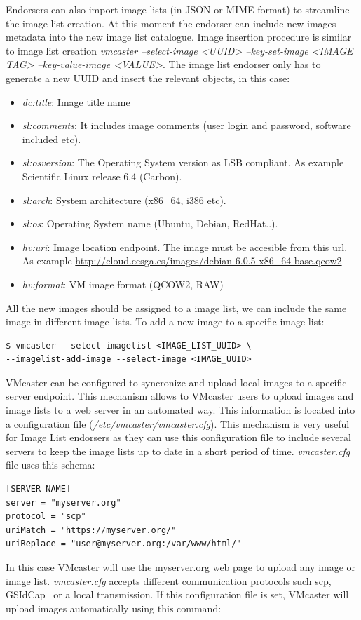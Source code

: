 \documentclass{cai}
\begin{document}
Endorsers can also import image lists (in JSON or MIME format) to streamline the image list creation. At this moment the endorser can include new images metadata into the new image list catalogue.
Image insertion procedure is similar to image list creation \textit{vmcaster --select-image <UUID> --key-set-image <IMAGE TAG> --key-value-image <VALUE>}.  
The image list endorser only has to generate a new UUID and insert the relevant objects, in this case:
\begin{itemize}
 \item \textit{dc:title}: Image title name
 \item \textit{sl:comments}: It includes image comments (user login and password, software included etc).
 \item \textit{sl:osversion}: The Operating System version as LSB compliant. As example Scientific Linux release 6.4 (Carbon).
 \item \textit{sl:arch}: System architecture (x86\_64, i386 etc).
 \item \textit{sl:os}: Operating System name (Ubuntu, Debian, RedHat..).
 \item \textit{hv:uri}: Image location endpoint. The image must be accesible from this url. As example \url{http://cloud.cesga.es/images/debian-6.0.5-x86_64-base.qcow2}
 \item \textit{hv:format}: VM image format (QCOW2, RAW)
\end{itemize}
All the new images should be assigned to a image list, we can include the same image in different image lists. To add a new image to a specific image list:

\begin{verbatim}
$ vmcaster --select-imagelist <IMAGE_LIST_UUID> \
--imagelist-add-image --select-image <IMAGE_UUID>
\end{verbatim}

VMcaster can be configured to syncronize and upload local images to a specific server endpoint. This mechanism allows to VMcaster users to upload images and image lists to a web server in an automated way.
This information is located into a configuration file (\textit{/etc/vmcaster/vmcaster.cfg}). This mechanism is very useful for Image List endorsers as they can use this configuration file to include several servers to keep the image lists up to date in a short period of time.
\textit{vmcaster.cfg} file uses this schema:
\begin{verbatim}
[SERVER NAME]
server = "myserver.org"
protocol = "scp"
uriMatch = "https://myserver.org/"
uriReplace = "user@myserver.org:/var/www/html/"
\end{verbatim}
In this case VMcaster will use the \url{myserver.org} web page to upload any image or image list. 
\textit{vmcaster.cfg} accepts different communication protocols such scp, GSIdCap~\cite{dcache} or a local transmission. If this configuration file is set, VMcaster will upload images automatically using this command:
\end{document}
